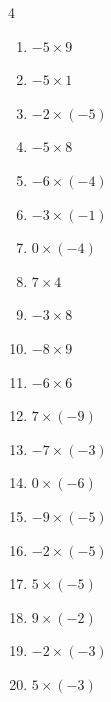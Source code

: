 \begin{multicols}{4}
\begin{enumerate}
  \item $-5\times 9$
        \phantom{$=-45$}

  \item $-5\times 1$
        \phantom{$=-5$}

  \item $-2\times (-5)$
        \phantom{$=10$}

  \item $-5\times 8$
        \phantom{$=-40$}

  \item $-6\times (-4)$
        \phantom{$=24$}

  \item $-3\times (-1)$
        \phantom{$=3$}

  \item $0\times (-4)$
        \phantom{$=0$}

  \item $7\times 4$
        \phantom{$=28$}

  \item $-3\times 8$
        \phantom{$=-24$}

  \item $-8\times 9$
        \phantom{$=-72$}

\columnbreak %

  \item $-6\times 6$
        \phantom{$=-36$}

  \item $7\times (-9)$
        \phantom{$=-63$}

  \item $-7\times (-3)$
        \phantom{$=21$}

  \item $0\times (-6)$
        \phantom{$=0$}

  \item $-9\times (-5)$
        \phantom{$=45$}

  \item $-2\times (-5)$
        \phantom{$=10$}

  \item $5\times (-5)$
        \phantom{$=-25$}

  \item $9\times (-2)$
        \phantom{$=-18$}

  \item $-2\times (-3)$
        \phantom{$=6$}

  \item $5\times (-3)$
        \phantom{$=-15$}


\end{enumerate}
\end{multicols}
